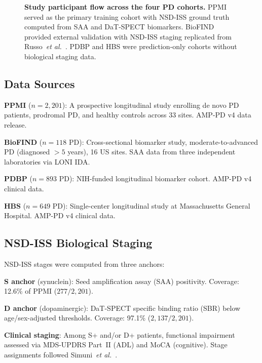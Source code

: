 \begin{figure}[!t]
\caption{\textbf{Study participant flow across the four PD cohorts.} PPMI served as the primary training cohort with NSD-ISS ground truth computed from SAA and DaT-SPECT biomarkers. BioFIND provided external validation with NSD-ISS staging replicated from Russo~\textit{et al.}~\cite{russo2025}. PDBP and HBS were prediction-only cohorts without biological staging data.}
\label{p1:fig:consort}
\end{figure}

\subsection{Data Sources}
\textbf{PPMI} ($n{=}2{,}201$): A prospective longitudinal study enrolling de novo PD patients, prodromal PD, and healthy controls across 33 sites. AMP-PD v4 data release.

\textbf{BioFIND} ($n{=}118$ PD): Cross-sectional biomarker study, moderate-to-advanced PD (diagnosed ${>}5$ years), 16 US sites. SAA data from three independent laboratories via LONI IDA.

\textbf{PDBP} ($n{=}893$ PD): NIH-funded longitudinal biomarker cohort. AMP-PD v4 clinical data.

\textbf{HBS} ($n{=}649$ PD): Single-center longitudinal study at Massachusetts General Hospital. AMP-PD v4 clinical data.

\subsection{NSD-ISS Biological Staging}
NSD-ISS stages were computed from three anchors:

\textbf{S anchor} (synuclein): Seed amplification assay (SAA) positivity. Coverage: 12.6\% of PPMI ($277/2{,}201$).

\textbf{D anchor} (dopaminergic): DaT-SPECT specific binding ratio (SBR) below age/sex-adjusted thresholds. Coverage: 97.1\% ($2{,}137/2{,}201$).

\textbf{Clinical staging}: Among S+ and/or D+ patients, functional impairment assessed via MDS-UPDRS Part~II (ADL) and MoCA (cognitive). Stage assignments followed Simuni~\textit{et al.}~\cite{simuni2024}.

